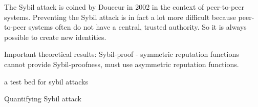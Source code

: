 The Sybil attack is coined by Douceur\cite{douceur2002sybil} in 2002 in the
context of peer-to-peer systems. Preventing the Sybil attack is in fact a lot
more difficult because peer-to-peer systems often do not have a central, trusted
authority. So it is always possible to create new identities.

Important theoretical results:
Sybil-proof\cite{cheng2005sybilproof} - symmetric reputation functions cannot
provide Sybil-proofness, must use asymmetric reputation functions.

a test bed for sybil attacks\cite{irissappane2012towards}

Quantifying Sybil attack\cite{margolin2008quantifying}

